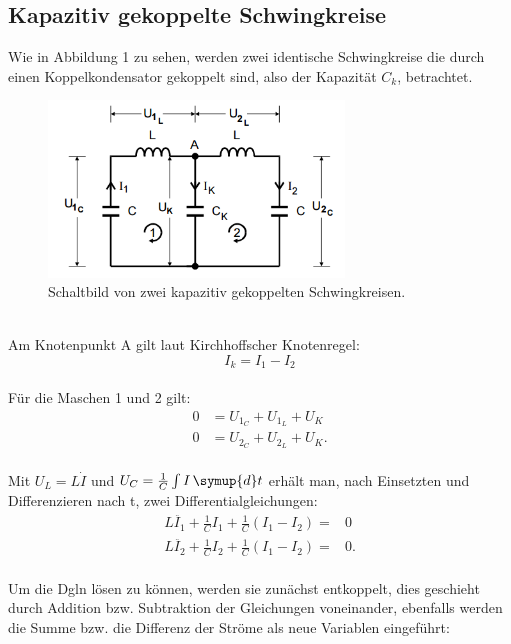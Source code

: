 \subsection{Kapazitiv gekoppelte Schwingkreise}
Wie in Abbildung 1 zu sehen, werden zwei identische Schwingkreise die durch einen Koppelkondensator gekoppelt sind, also der Kapazität $C_k$,
betrachtet.
  \begin{figure}
    \centering
    \includegraphics[width=0.7\textwidth]{Prinzipschaltbild.PNG}
    \caption{Schaltbild von zwei kapazitiv gekoppelten Schwingkreisen.\cite{skript}}
    \label{abb:SchaltbildSchwingkreis}
    \end{figure}\\
\newpage
Am Knotenpunkt A gilt laut Kirchhoffscher Knotenregel:\\
 \begin{equation}
   I_k = I_1 - I_2
 \end{equation}\\
 Für die Maschen 1 und 2 gilt:
 \begin{align}
  0&= U_{1_C} + U_{1_L} + U_K \label{eqn:maschenregel1}\\
  0&= U_{2_C} + U_{2_L} + U_K \label{eqn:maschenregel2}.
 \end{align}\\
Mit $U_L=L\dot{I}$ und $U_C = \frac{1}{C}\int I\, \symup{d}t$ erhält man, nach Einsetzten und Differenzieren nach t, zwei Differentialgleichungen:\\
\begin{align}
  L\ddot{I_1} + \frac{1}{C}I_1 + \frac{1}{C}  (I_1-I_2) =&0\\
  L\ddot{I_2} + \frac{1}{C}I_2 + \frac{1}{C}  (I_1-I_2) =&0.
\end{align}\\
Um die Dgln lösen zu können, werden sie zunächst entkoppelt, dies geschieht durch Addition bzw. Subtraktion der Gleichungen voneinander,
ebenfalls werden die Summe bzw. die Differenz der Ströme als neue Variablen eingeführt:\\
